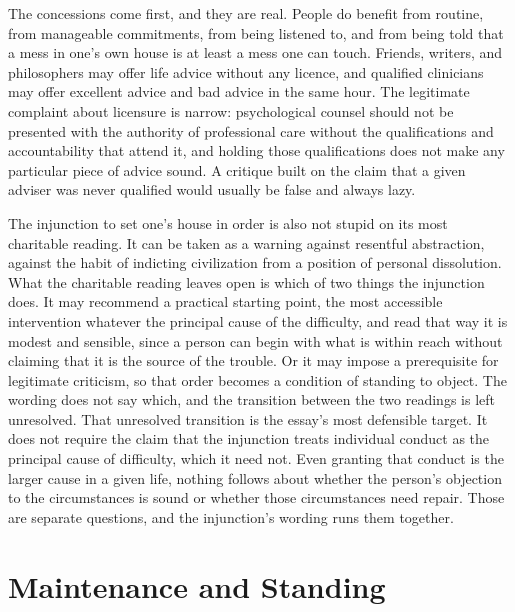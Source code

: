 \documentclass[12pt]{article}
\begin{document}
The concessions come first, and they are real. People do benefit from routine, from manageable commitments, from being listened to, and from being told that a mess in one's own house is at least a mess one can touch. Friends, writers, and philosophers may offer life advice without any licence, and qualified clinicians may offer excellent advice and bad advice in the same hour. The legitimate complaint about licensure is narrow: psychological counsel should not be presented with the authority of professional care without the qualifications and accountability that attend it, and holding those qualifications does not make any particular piece of advice sound. A critique built on the claim that a given adviser was never qualified would usually be false and always lazy.

The injunction to set one's house in order is also not stupid on its most charitable reading. It can be taken as a warning against resentful abstraction, against the habit of indicting civilization from a position of personal dissolution. What the charitable reading leaves open is which of two things the injunction does. It may recommend a practical starting point, the most accessible intervention whatever the principal cause of the difficulty, and read that way it is modest and sensible, since a person can begin with what is within reach without claiming that it is the source of the trouble. Or it may impose a prerequisite for legitimate criticism, so that order becomes a condition of standing to object. The wording does not say which, and the transition between the two readings is left unresolved. That unresolved transition is the essay's most defensible target. It does not require the claim that the injunction treats individual conduct as the principal cause of difficulty, which it need not. Even granting that conduct is the larger cause in a given life, nothing follows about whether the person's objection to the circumstances is sound or whether those circumstances need repair. Those are separate questions, and the injunction's wording runs them together.

\section{Maintenance and Standing}\label{sec:standing}
\end{document}
